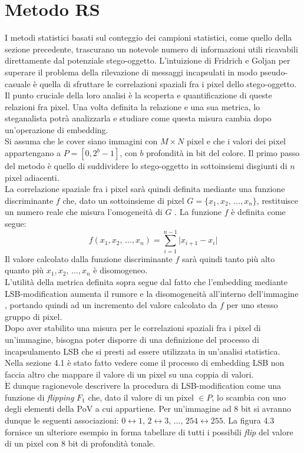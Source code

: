 		\section{Metodo RS}
I metodi statistici basati sul conteggio dei campioni statistici, come quello della sezione precedente, trascurano un notevole numero di informazioni utili ricavabili direttamente dal potenziale stego-oggetto. L'intuizione di Fridrich e Goljan \cite{fried1, fried2} per superare il problema della rilevazione di messaggi incapsulati in modo pseudo-casuale è quella di sfruttare le correlazioni spaziali fra i pixel dello stego-oggetto. Il punto cruciale della loro analisi è la scoperta e quantificazione di queste relazioni fra pixel. Una volta definita la relazione e una sua metrica, lo steganalista potrà analizzarla e studiare come questa misura cambia dopo un'operazione di embedding.\\Si assuma che le cover siano immagini con $M\times N$ pixel e che i valori dei pixel appartengano a $P=[0, 2^b-1]$, con $b$ profondità in bit del colore. Il primo passo del metodo è quello di suddividere lo stego-oggetto in sottoinsiemi disgiunti di $n$ pixel adiacenti.\\La correlazione spaziale fra i pixel sarà quindi definita mediante una funzione discriminante $f$ che, dato un sottoinsieme di pixel $G = \lbrace x_1, x_2,\, \dots, x_n \rbrace$, restituisce un numero reale che misura l'omogeneità di $G$ \cite{fried1, fried2}. La funzione $f$ è definita come segue:
\[ f(x_1, x_2,\, \dots, x_n)=\sum^{n-1}_{i = 1}\vert x_{i+1} - x_i \vert\]
Il valore calcolato dalla funzione discriminante $f$ sarà quindi tanto più alto quanto più $x_1, x_2,\, \dots, x_n$ è disomogeneo.\\L'utilità della metrica definita sopra segue dal fatto che l'embedding mediante LSB-modification aumenta il rumore e la disomogeneità all'interno dell'immagine \cite{fried1}, portando quindi ad un incremento del valore calcolato da $f$ per uno stesso gruppo di pixel.\\Dopo aver stabilito una misura per le correlazioni spaziali fra i pixel di un'immagine, bisogna poter disporre di una definizione del processo di incapsulamento LSB che si presti ad essere utilizzata in un'analisi statistica.\\Nella sezione 4.1 è stato fatto vedere come il processo di embedding LSB non faccia altro che mappare il valore di un pixel su una coppia di valori.\\$\mathrm{\grave{E}}$ dunque ragionevole descrivere la procedura di LSB-modification come una funzione di \textit{flipping} $F_1$ che, dato il valore di un pixel $\in P$, lo scambia con uno degli elementi della PoV a cui appartiene. Per un'immagine ad 8 bit si avranno dunque le seguenti associazioni: $0\leftrightarrow 1,\, 2 \leftrightarrow 3,\, \dots,\, 254\leftrightarrow 255$. La figura 4.3 fornisce un ulteriore esempio in forma tabellare di tutti i possibili \textit{flip} del valore di un pixel con 8 bit di profondità tonale.

